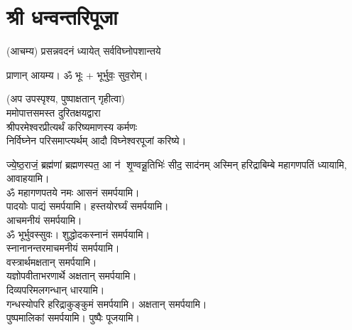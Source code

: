 
\setlength{\parindent}{0pt}
\chapter{श्री धन्वन्तरिपूजा}


(आचम्य)
{प्रसन्नवदनं ध्यायेत् सर्वविघ्नोपशान्तये}
 
प्राणान्  आयम्य।  ॐ भूः + भूर्भुवः॒ सुव॒रोम्।
 
(अप उपस्पृश्य, पुष्पाक्षतान् गृहीत्वा)\\
ममोपात्तसमस्त दुरितक्षयद्वारा \\
श्रीपरमेश्वरप्रीत्यर्थं करिष्यमाणस्य कर्मणः\\
 निर्विघ्नेन परिसमाप्त्यर्थम् आदौ विघ्नेश्वरपूजां करिष्ये।

{ज्ये॒ष्ठ॒राजं॒ ब्रह्म॑णां ब्रह्मणस्पत॒ आ न॑ शृ॒ण्वन्नू॒तिभिः॑ सीद॒ साद॑नम्}
अस्मिन् हरिद्राबिम्बे महागणपतिं ध्यायामि, आवाहयामि।\\


ॐ महागणपतये नमः  आसनं समर्पयामि।\\
पादयोः पाद्यं समर्पयामि। हस्तयोरर्घ्यं समर्पयामि।\\
आचमनीयं समर्पयामि।\\
ॐ भूर्भुवस्सुवः। शुद्धोदकस्नानं समर्पयामि।\\
स्नानानन्तरमाचमनीयं समर्पयामि।\\
वस्त्रार्थमक्षतान् समर्पयामि।\\
यज्ञोपवीताभरणार्थे अक्षतान् समर्पयामि।\\
दिव्यपरिमलगन्धान् धारयामि।\\
गन्धस्योपरि हरिद्राकुङ्कुमं समर्पयामि। अक्षतान् समर्पयामि। \\
पुष्पमालिकां समर्पयामि। पुष्पैः पूजयामि।

